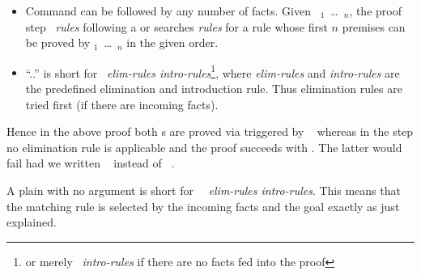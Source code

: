 \begin{isabellebody}
\begin{isamarkuptext}
\begin{itemize}
\item Command  can be
followed by any number of facts.  Given ~$_1$~\dots~$_n$, the proof step
~\textit{rules} following a 
or  searches \textit{rules} for a rule whose first
$n$ premises can be proved by $_1$~\dots~$_n$ in the
given order.
\item ``..'' is short for
~\textit{elim-rules intro-rules}\footnote{or
merely ~\textit{intro-rules} if there are no facts
fed into the proof}, where \textit{elim-rules} and \textit{intro-rules}
are the predefined elimination and introduction rule. Thus
elimination rules are tried first (if there are incoming facts).
\end{itemize}
Hence in the above proof both s are proved via
 triggered by ~ whereas
in the  step no elimination rule is applicable and
the proof succeeds with . The latter would fail had
we written ~ instead of
~.

A plain  with no argument is short for
~~\textit{elim-rules intro-rules}\footnotemark[1].
This means that the matching rule is selected by the incoming facts and the goal exactly as just explained.


\end{isamarkuptext}
\end{isabellebody}
